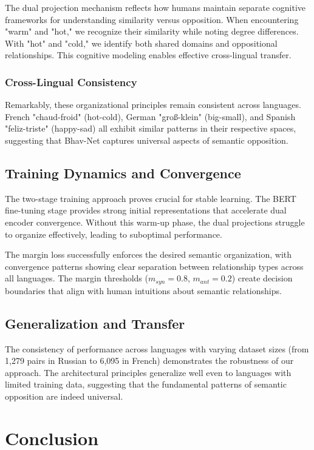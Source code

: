 \documentclass[11pt]{article}
\begin{document}
The dual projection mechanism reflects how humans maintain separate cognitive frameworks for understanding similarity versus opposition. When encountering "warm" and "hot," we recognize their similarity while noting degree differences. With "hot" and "cold," we identify both shared domains and oppositional relationships. This cognitive modeling enables effective cross-lingual transfer.

\subsubsection{Cross-Lingual Consistency}
Remarkably, these organizational principles remain consistent across languages. French "chaud-froid" (hot-cold), German "groß-klein" (big-small), and Spanish "feliz-triste" (happy-sad) all exhibit similar patterns in their respective spaces, suggesting that Bhav-Net captures universal aspects of semantic opposition.

\subsection{Training Dynamics and Convergence}

The two-stage training approach proves crucial for stable learning. The BERT fine-tuning stage provides strong initial representations that accelerate dual encoder convergence. Without this warm-up phase, the dual projections struggle to organize effectively, leading to suboptimal performance.

The margin loss successfully enforces the desired semantic organization, with convergence patterns showing clear separation between relationship types across all languages. The margin thresholds ($m_{syn} = 0.8$, $m_{ant} = 0.2$) create decision boundaries that align with human intuitions about semantic relationships.

\subsection{Generalization and Transfer}

The consistency of performance across languages with varying dataset sizes (from 1,279 pairs in Russian to 6,095 in French) demonstrates the robustness of our approach. The architectural principles generalize well even to languages with limited training data, suggesting that the fundamental patterns of semantic opposition are indeed universal.

\section{Conclusion}
\end{document}
